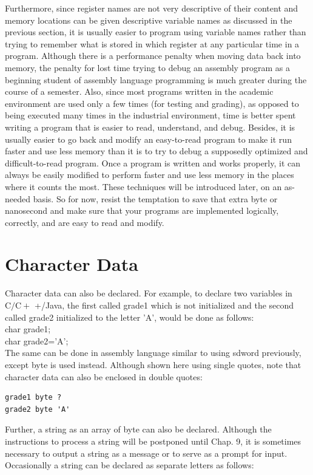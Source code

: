 \documentclass[10pt]{book}
\begin{document}
Furthermore, since register names are not very descriptive of their content and memory locations can be given descriptive variable names as discussed in the previous section, it is usually easier to program using variable names rather than trying to remember what is stored in which register at any particular time in a program. Although there is a performance penalty when moving data back into memory, the penalty for lost time trying to debug an assembly program as a beginning student of assembly language programming is much greater during the course of a semester. Also, since most programs written in the academic environment are used only a few times (for testing and grading), as opposed to being executed many times in the industrial environment, time is better spent writing a program that is easier to read, understand, and debug. Besides, it is usually easier to go back and modify an easy-to-read program to make it run faster and use less memory than it is to try to debug a supposedly optimized and difficult-to-read program. Once a program is written and works properly, it can always be easily modified to perform faster and use less memory in the places where it counts the most. These techniques will be introduced later, on an as-needed basis. So for now, resist the temptation to save that extra byte or nanosecond and make sure that your programs are implemented logically, correctly, and are easy to read and modify.

\section{Character Data}
Character data can also be declared. For example, to declare two variables in $\mathrm{C} / \mathrm{C}+$ +/Java, the first called grade1 which is not initialized and the second called grade2 initialized to the letter 'A', would be done as follows:\\
char grade1;\\
char grade2='A';\\
The same can be done in assembly language similar to using sdword previously, except byte is used instead. Although shown here using single quotes, note that character data can also be enclosed in double quotes:

\begin{verbatim}
grade1 byte ?
grade2 byte 'A'
\end{verbatim}

Further, a string as an array of byte can also be declared. Although the instructions to process a string will be postponed until Chap. 9, it is sometimes necessary to output a string as a message or to serve as a prompt for input. Occasionally a string can be declared as separate letters as follows:
\end{document}
